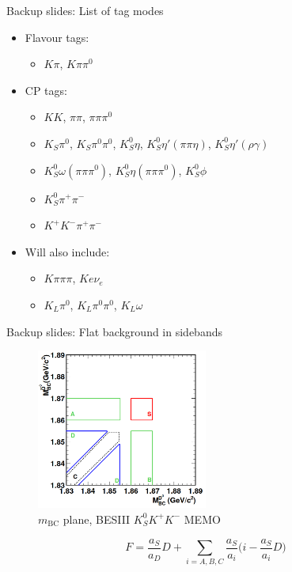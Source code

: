 \documentclass{beamer}
\begin{document}
\begin{frame}{Backup slides: List of tag modes}
  \begin{itemize}
    \item{Flavour tags:}
    \begin{itemize}
      \item{$K\pi$, $K\pi\pi^0$}
    \end{itemize}
    \item{CP tags}:
    \begin{itemize}
      \item{$KK$, $\pi\pi$, $\pi\pi\pi^0$}
      \item{$K_S\pi^0$, $K_S\pi^0\pi^0$, $K_S^0\eta$, $K_S^0\eta'(\pi\pi\eta)$, $K_S^0\eta'(\rho\gamma)$}
      \item{$K_S^0\omega(\pi\pi\pi^0)$, $K_S^0\eta(\pi\pi\pi^0)$, $K_S^0\phi$}
    \end{itemize}
    \begin{itemize}
      \item{$K_S^0\pi^+\pi^-$}
      \item{$K^+K^-\pi^+\pi^-$}
    \end{itemize}
    \item{Will also include:}
    \begin{itemize}
      \item{$K\pi\pi\pi$, $Ke\nu_e$}
      \item{$K_L\pi^0$, $K_L\pi^0\pi^0$, $K_L\omega$}
    \end{itemize}
  \end{itemize}
\end{frame}

\begin{frame}{Backup slides: Flat background in sidebands}
  \begin{figure}
    \centering
    \includegraphics[width=0.5\textwidth]{MBC2D.png}
    \caption{$m_\text{BC}$ plane, BESIII $K_S^0K^+K^-$ MEMO}
  \end{figure}
  \begin{equation*}
    F = \frac{a_S}{a_D}D + \sum_{i = A, B, C}\frac{a_S}{a_i}\Big(i - \frac{a_S}{a_i}D\Big)
  \end{equation*}
\end{frame}
\end{document}
